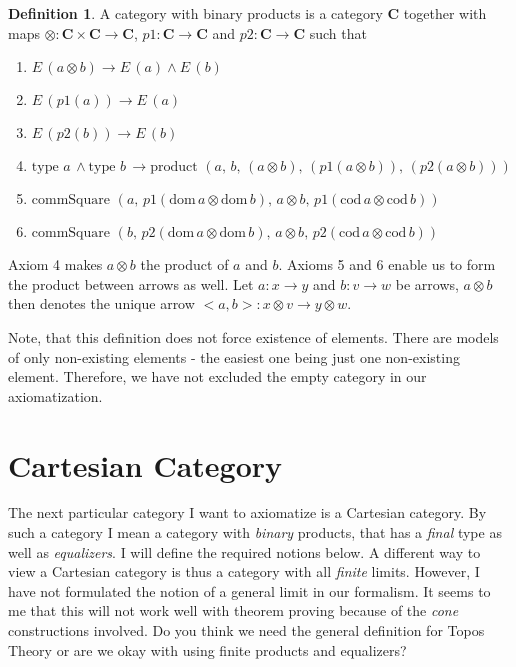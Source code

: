 \documentclass[a4paper, 11pt]{article}
\theoremstyle{definition}
\newtheorem{definition}[theorem]{Definition}
\newcommand{\cat}{%
	\mathbf %
}
\newcommand{\E}[1]{E \, (#1)}
\newcommand{\domain}[ 1 ]{%
	\mathrm{dom} \, #1 %
}
\newcommand{\codomain}[ 1 ]{%
	\mathrm{cod} \, #1%
}
\newcommand{\notion}[1]{\text{#1 }}
\newcommand{\commSquare}[4]{\notion{commSquare} (#1, \, #2, \, #3, \, #4)}
\newcommand{\product}[5]{\notion{product} (#1, \, #2, \, #3, \, #4, \, #5)}
\begin{document}
\begin{definition}
	A category with binary products is a category $\cat C$ together with maps $\otimes: \cat C \times \cat C \to \cat C$, $p1: \cat C \to \cat C$ and $p2: \cat C \to \cat C$ such that 
	\begin{enumerate}
		\item $\E{a \otimes b} \longrightarrow \E{a} \wedge \E{b}$
		\item $\E{p1(a)} \longrightarrow \E{a}$
		\item $\E{p2 (b)} \longrightarrow \E{b}$
		\item $\notion{type} a \, \wedge \notion{type} b \, \longrightarrow \product{a}{b}{(a\otimes b)}{(p1(a \otimes b))}{(p2 (a \otimes b))}$
		\item $\commSquare{a}{p1(\domain{a} \otimes \domain{b})}{a \otimes b}{p1(\codomain{a} \otimes \codomain{b})}$
		\item $\commSquare{b}{p2(\domain{a} \otimes \domain{b})}{a \otimes b}{p2(\codomain{a} \otimes \codomain{b})}$
	\end{enumerate}
\end{definition}

\noindent Axiom 4 makes $a \otimes b$ the product of $a$ and $b$. Axioms 5 and 6 enable us to form the product between arrows as well. Let $a:x\rightarrow y$ and $b:v \rightarrow w$ be arrows, $a\otimes b$ then denotes the unique arrow $<a, b>:x\otimes v \rightarrow y\otimes w$. 

Note, that this definition does not force existence of elements. There are models of only non-existing elements - the easiest one being just one non-existing element. Therefore, we have not excluded the empty category in our axiomatization.


\section{Cartesian Category}

The next particular category I want to axiomatize is a Cartesian category. By such a category I mean a category with \emph{binary} products, that has a \emph{final} type as well as \emph{equalizers}. I will define the required notions below.
A different way to view a Cartesian category is thus a category with all \emph{finite} limits.
However, I have not formulated the notion of a general limit in our formalism. It seems to me that this will not work well with theorem proving because of the \emph{cone} constructions involved. 
Do you think we need the general definition for Topos Theory or are we okay with using finite products and equalizers?
\end{document}
